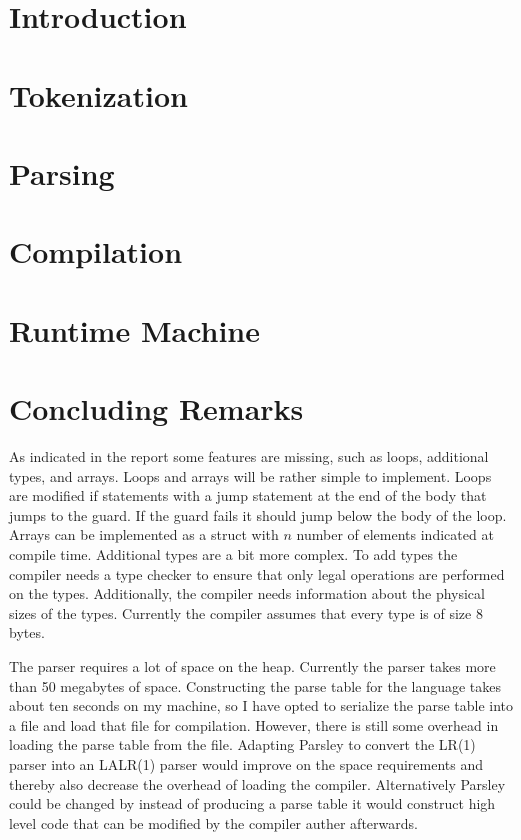 \documentclass[a4paper,12pt]{report}
\begin{document}
\newpage
\tableofcontents

\newpage
{} 
\setcounter{page}{1}

\chapter{Introduction}

\chapter{Tokenization}

\chapter{Parsing}


\chapter{Compilation}

\chapter{Runtime Machine}

\chapter{Concluding Remarks}

As indicated in the report some features are missing, such as loops, additional types, and arrays. Loops and arrays will be rather simple to implement. Loops are modified if statements with a jump statement at the end of the body that jumps to the guard. If the guard fails it should jump below the body of the loop. Arrays can be implemented as a struct with $n$ number of elements indicated at compile time. Additional types are a bit more complex. To add types the compiler needs a type checker to ensure that only legal operations are performed on the types. Additionally, the compiler needs information about the physical sizes of the types. Currently the compiler assumes that every type is of size 8 bytes. 

The parser requires a lot of space on the heap. Currently the parser takes more than 50 megabytes of space. Constructing the parse table for the language takes about ten seconds on my machine, so I have opted to serialize the parse table into a file and load that file for compilation. However, there is still some overhead in loading the parse table from the file. Adapting Parsley to convert the LR(1) parser into an LALR(1) parser would improve on the space requirements and thereby also decrease the overhead of loading the compiler. Alternatively Parsley could be changed by instead of producing a parse table it would construct high level code that can be modified by the compiler auther afterwards.
\end{document}
